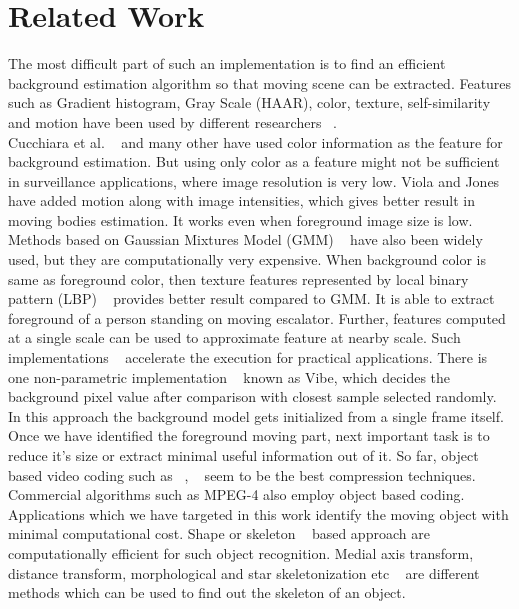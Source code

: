 \documentclass[conference]{IEEEtran}
\begin{document}
\section{Related Work}
The most difficult part of such an implementation is to find an
efficient background estimation algorithm so that moving scene can be
extracted. Features such as Gradient histogram, Gray Scale (HAAR),
color, texture, self-similarity and motion have been used by different
researchers ~\cite{3, 5, 1, 6, 13}. \\
\indent Cucchiara et al. ~\cite{1} and many other have used color
information as the feature for background estimation. But using only
color as a feature might not be sufficient in surveillance applications,
where image resolution is very low. Viola and Jones ~\cite{2} have added
motion along with image intensities, which gives better result in moving
bodies estimation. It works even when foreground image size is low.
Methods based on Gaussian Mixtures Model (GMM) ~\cite{15} have also been
widely used, but they are computationally very expensive.  When
background color is same as foreground color, then texture features
represented by local binary pattern (LBP) ~\cite{3} provides better
result compared to GMM. It is able to extract foreground of a person
standing on moving escalator. Further, features computed at a single
scale can be used to approximate feature at nearby scale. Such
implementations ~\cite{4} accelerate the execution for practical
applications. There is one non-parametric implementation ~\cite{5} known
as Vibe, which decides the background pixel value after comparison with
closest sample selected randomly. In this approach the background model
gets initialized from a single frame itself.\\
\indent Once we have identified the foreground moving part, next
important task is to reduce it's size or extract minimal useful
information out of it. So far, object based video coding such as
~\cite{7}, ~\cite{8} seem to be the best compression techniques.
Commercial algorithms such as MPEG-4 also employ object based coding.
Applications which we have targeted in this work identify the moving
object with minimal computational cost. Shape or skeleton ~\cite{11}
based approach are computationally efficient for such object
recognition. Medial axis transform, distance transform, morphological
and star skeletonization etc ~\cite{9, 10} are different methods
which can be used to find out the skeleton of an object.\\
\end{document}
